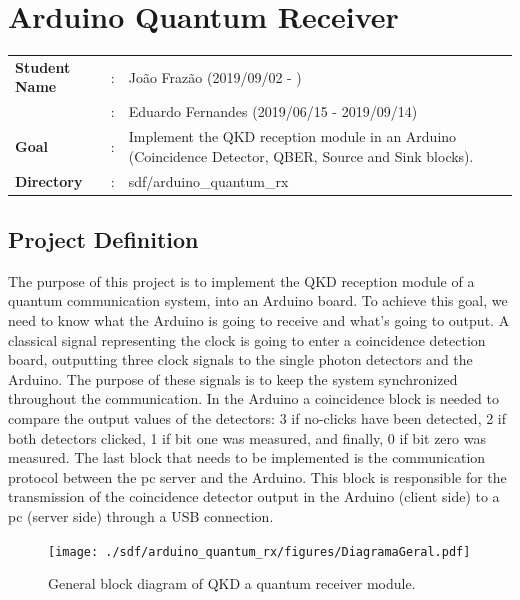 \clearpage
\section{Arduino Quantum Receiver}

\begin{refsection}
	
	\begin{tcolorbox}	
		\begin{tabular}{p{2.75cm} p{0.2cm} p{10.5cm}} 	
			\textbf{Student Name}  		&:&  Jo\~ao Fraz\~ao (2019/09/02 - )\\
			&:&  Eduardo Fernandes (2019/06/15 - 2019/09/14)\\
			\textbf{Goal}          &:& Implement the QKD reception module in an Arduino (Coincidence Detector, QBER, Source and Sink blocks).\\
			\textbf{Directory}              &:& sdf/arduino\_quantum\_rx
		\end{tabular}
	\end{tcolorbox}
	
	
	\subsection{Project Definition}
	
The purpose of this project is to implement the QKD reception module of a quantum communication system, into an Arduino board. To achieve this goal, we need to know what the Arduino is going to receive and what's going to output. A classical signal representing the clock is going to enter a coincidence detection board, outputting three clock signals to the single photon detectors and the Arduino. The purpose of these signals is to keep the system synchronized throughout the communication. In the Arduino a coincidence block is needed to compare the output values of the detectors: 3 if no-clicks have been detected, 2 if both detectors clicked, 1 if bit one was measured, and finally, 0 if bit zero was measured. The last block that needs to be implemented is the communication protocol between the pc server and the Arduino. This block is responsible for the transmission of the coincidence detector output in the Arduino (client side) to a pc (server side) through a USB connection.  


		
	\begin{figure}[H]
		\centering
		\texttt{[image: ./sdf/arduino\_quantum\_rx/figures/DiagramaGeral.pdf]}
		\caption{General block diagram of QKD a quantum receiver module.}
		\label{fig:arduino}
		

\end{figure}
\end{refsection}
